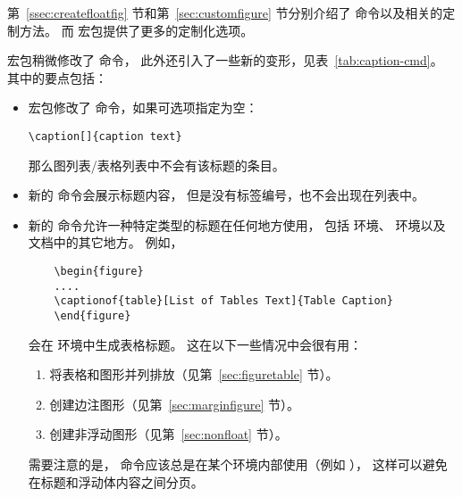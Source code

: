第~\ref{ssec:createfloatfig} 节和第~\ref{sec:customfigure} 节分别介绍了  命令以及相关的定制方法。
而  宏包提供了更多的定制化选项。

 宏包稍微修改了  命令，
此外还引入了一些新的变形，见表~\ref{tab:caption-cmd}。
其中的要点包括：
\begin{itemize}
	\item {} 宏包修改了  命令，如果可选项指定为空：
\begin{lstlisting}
\caption[]{caption text}
\end{lstlisting}
	那么图列表/表格列表中不会有该标题的条目。
	
	\item 新的  命令会展示标题内容，
	但是没有标签编号，也不会出现在列表中。
	
	\item 新的  命令允许一种特定类型的标题在任何地方使用，
	包括  环境、 环境以及文档中的其它地方。
	例如，
	\begin{lstlisting}
	\begin{figure}
	....
	\captionof{table}[List of Tables Text]{Table Caption}
	\end{figure}
	\end{lstlisting}
	会在  环境中生成表格标题。
	这在以下一些情况中会很有用：
	\begin{enumerate}
		\item 将表格和图形并列排放（见第~\ref{sec:figuretable} 节）。
		\item 创建边注图形（见第~\ref{sec:marginfigure} 节）。
		\item 创建非浮动图形（见第~\ref{sec:nonfloat} 节）。
	\end{enumerate}
	需要注意的是， 命令应该总是在某个环境内部使用（例如 ），
	这样可以避免在标题和浮动体内容之间分页。
\end{itemize}

